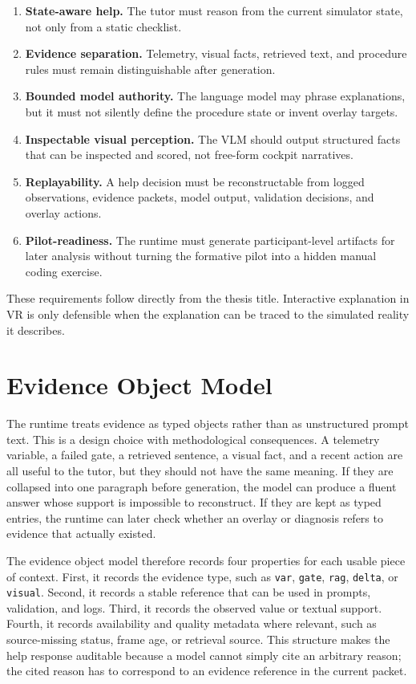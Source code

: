 \begin{enumerate}
\item \textbf{State-aware help.} The tutor must reason from the current
simulator state, not only from a static checklist.
\item \textbf{Evidence separation.} Telemetry, visual facts, retrieved text,
and procedure rules must remain distinguishable after generation.
\item \textbf{Bounded model authority.} The language model may phrase
explanations, but it must not silently define the procedure state or invent
overlay targets.
\item \textbf{Inspectable visual perception.} The VLM should output structured
facts that can be inspected and scored, not free-form cockpit narratives.
\item \textbf{Replayability.} A help decision must be reconstructable from
logged observations, evidence packets, model output, validation decisions, and
overlay actions.
\item \textbf{Pilot-readiness.} The runtime must generate participant-level
artifacts for later analysis without turning the formative pilot into a hidden
manual coding exercise.
\end{enumerate}

These requirements follow directly from the thesis title. Interactive
explanation in VR is only defensible when the explanation can be traced to the
simulated reality it describes.

\section{Evidence Object Model}\label{sec:design-evidence-model}

The runtime treats evidence as typed objects rather than as unstructured prompt
text. This is a design choice with methodological consequences. A telemetry
variable, a failed gate, a retrieved sentence, a visual fact, and a recent
action are all useful to the tutor, but they should not have the same meaning.
If they are collapsed into one paragraph before generation, the model can
produce a fluent answer whose support is impossible to reconstruct. If they are
kept as typed entries, the runtime can later check whether an overlay or
diagnosis refers to evidence that actually existed.

The evidence object model therefore records four properties for each usable
piece of context. First, it records the evidence type, such as \texttt{var},
\texttt{gate}, \texttt{rag}, \texttt{delta}, or \texttt{visual}. Second, it
records a stable reference that can be used in prompts, validation, and logs.
Third, it records the observed value or textual support. Fourth, it records
availability and quality metadata where relevant, such as source-missing status,
frame age, or retrieval source. This structure makes the help response
auditable because a model cannot simply cite an arbitrary reason; the cited
reason has to correspond to an evidence reference in the current packet.

